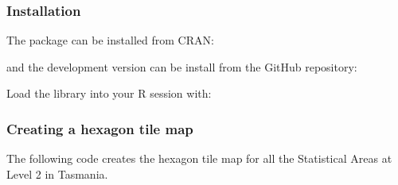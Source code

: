 \documentclass{monashthesis}
\begin{document}
\hypertarget{installation}{%
\subsubsection{Installation}\label{installation}}

The package can be installed from CRAN:

\begin{Shaded}
\begin{Highlighting}[]
\NormalTok{(}\NormalTok{)}
\end{Highlighting}
\end{Shaded}

and the development version can be install from the GitHub repository:

\begin{Shaded}
\begin{Highlighting}[]
\OperatorTok{::}\NormalTok{(}\NormalTok{,}\NormalTok{)}
\end{Highlighting}
\end{Shaded}

Load the library into your R session with:

\begin{Shaded}
\begin{Highlighting}[]
\end{Highlighting}
\end{Shaded}

\hypertarget{creating-a-hexagon-tile-map}{%
\subsubsection{Creating a hexagon tile map}\label{creating-a-hexagon-tile-map}}

The following code creates the hexagon tile map for all the Statistical Areas at Level 2 in Tasmania.
\end{document}
